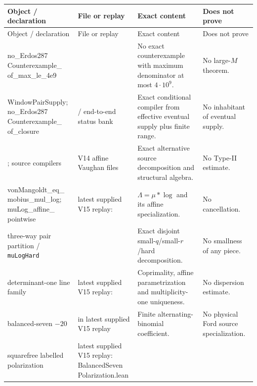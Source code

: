 \documentclass[11pt]{article}
\theoremstyle{definition}
\newcommand{\1}{\mathbf 1}
\begin{document}
{\footnotesize\begin{longtable}{p{}p{}p{}p{}}
\toprule
Object / declaration & File or replay & Exact content & Does not prove\\
\midrule
\endfirsthead
\toprule
Object / declaration & File or replay & Exact content & Does not prove\\
\midrule
\endhead
\parbox[t]{0.19\textwidth}{\raggedright\scriptsize\ttfamily no\_Erdos287\\Counterexample\_\\of\_max\_le\_4e9} &
 &
No exact counterexample with maximum denominator at most $4\cdot10^9$. &
No large-$M$ theorem.\\
\parbox[t]{0.19\textwidth}{\raggedright\scriptsize\ttfamily WindowPairSupply;\\no\_Erdos287\\Counterexample\_\\of\_closure} &
 / end-to-end status bank &
Exact conditional compiler from effective eventual supply plus finite range. &
No inhabitant of eventual supply.\\
; source compilers &
V14 affine Vaughan files &
Exact alternative source decomposition and structural algebra. &
No Type-II estimate.\\
\parbox[t]{0.19\textwidth}{\raggedright\scriptsize\ttfamily
vonMangoldt\_eq\_\\mobius\_mul\_log;\\muLog\_affine\_\\pointwise} &
latest supplied V15 replay:
 &
$\Lambda=\mu*\log$ and its affine specialization. &
No cancellation.\\
three-way pair partition / \texttt{muLogHard} &
 &
Exact disjoint small-$q$/small-$r$/hard decomposition. &
No smallness of any piece.\\
determinant-one line family &
latest supplied V15 replay:
 &
Coprimality, affine parametrization and multiplicity-one uniqueness. &
No dispersion estimate.\\
balanced-seven $-20$ &
 in latest supplied V15 replay &
Finite alternating-binomial coefficient. &
No physical Ford source specialization.\\
squarefree labelled polarization &
\parbox[t]{0.21\textwidth}{\raggedright\scriptsize latest supplied V15 replay:\\{\ttfamily BalancedSeven\\Polarization.lean}} &

\end{longtable}}
\end{document}
